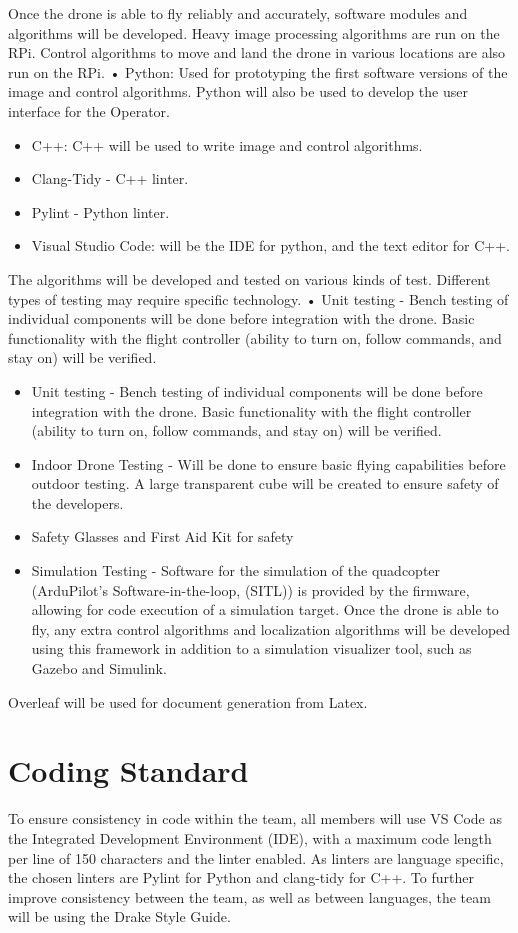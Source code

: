 \documentclass{article}
\begin{document}
Once the drone is able to fly reliably and accurately, software modules and algorithms will be developed. Heavy image processing algorithms are run on the RPi. Control algorithms to move and land the drone in various locations are also run on the RPi.
• Python: Used for prototyping the first software versions of the image and control algorithms. Python will also be used to develop the user interface for the Operator. 
\begin{itemize}
    \item C++: C++ will be used to write image and control algorithms.
\item Clang-Tidy - C++ linter.
\item Pylint - Python linter.
\item Visual Studio Code: will be the IDE for python, and the text editor for C++.
\end{itemize}


The algorithms will be developed and tested on various kinds of test. Different types of testing may require specific technology.
• Unit testing - Bench testing of individual components will be done before integration with the drone. Basic functionality with the flight controller (ability to turn on, follow commands, and stay on) will be verified. 
\begin{itemize}
    \item Unit testing - Bench testing of individual components will be done before integration with the drone. Basic functionality with the flight controller (ability to turn on, follow commands, and stay on) will be verified. 
    \item Indoor Drone Testing - Will be done to ensure basic flying capabilities before outdoor testing. A large transparent cube will be created to ensure safety of the developers.  
    \item Safety Glasses  and First Aid Kit for safety
    \item Simulation Testing - Software for the simulation of the quadcopter (ArduPilot's Software-in-the-loop, (SITL)) is provided by the firmware, allowing for code execution of a simulation target. Once the drone is able to fly, any extra control algorithms and localization algorithms will be developed using this framework in addition to a simulation visualizer tool, such as Gazebo and Simulink. 
\end{itemize}


Overleaf will be used for document generation from Latex.


\section{Coding Standard}
To ensure consistency in code within the team, all members will use VS Code as the Integrated Development Environment (IDE), with a maximum code length per line of 150 characters and the linter enabled. As linters are language specific, the chosen linters are Pylint for Python and clang-tidy for C++. To further improve consistency between the team, as well as between languages, the team will be using the Drake Style Guide. 
\end{document}
